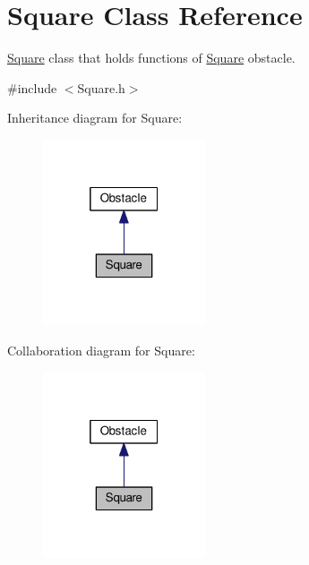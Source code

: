 \hypertarget{classSquare}{}\section{Square Class Reference}
\label{classSquare}


\hyperlink{classSquare}{Square} class that holds functions of \hyperlink{classSquare}{Square} obstacle.  




{\ttfamily \#include $<$Square.\+h$>$}



Inheritance diagram for Square\+:\nopagebreak
\begin{figure}[H]
\begin{center}
\leavevmode
\includegraphics[width=136pt]{classSquare__inherit__graph}
\end{center}
\end{figure}


Collaboration diagram for Square\+:\nopagebreak
\begin{figure}[H]
\begin{center}
\leavevmode
\includegraphics[width=136pt]{classSquare__coll__graph}
\end{center}
\end{figure}
